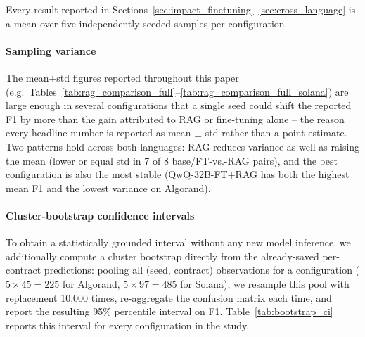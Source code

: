 \documentclass[lettersize,journal]{IEEEtran}
\begin{document}
Every result reported in Sections~\ref{sec:impact_finetuning}--\ref{sec:cross_language} is a mean
over five independently seeded samples per configuration.

\paragraph{Sampling variance}

The mean$\pm$std figures reported throughout this paper (e.g.\
Tables~\ref{tab:rag_comparison_full}--\ref{tab:rag_comparison_full_solana}) are large enough in
several configurations that a single seed could shift the reported F1 by more than the gain
attributed to RAG or fine-tuning alone -- the reason every headline number is reported as mean $\pm$
std rather than a point estimate. Two patterns hold across both languages: RAG reduces
variance as well as raising the mean (lower or equal std in 7 of 8 base/FT-vs.-RAG pairs), and
the best configuration is also the most stable (QwQ-32B-FT+RAG has both the highest mean F1
and the lowest variance on Algorand).

\paragraph{Cluster-bootstrap confidence intervals}
\label{sec:bootstrap_ci}
To obtain a
statistically grounded interval without any new model inference, we additionally compute a cluster
bootstrap directly from the already-saved per-contract predictions: pooling all (seed, contract)
observations for a configuration ($5\times45=225$ for Algorand, $5\times97=485$ for Solana), we
resample this pool with replacement 10{,}000 times, re-aggregate the confusion matrix each time, and
report the resulting 95\% percentile interval on F1. Table~\ref{tab:bootstrap_ci} reports this
interval for every configuration in the study.
\end{document}
